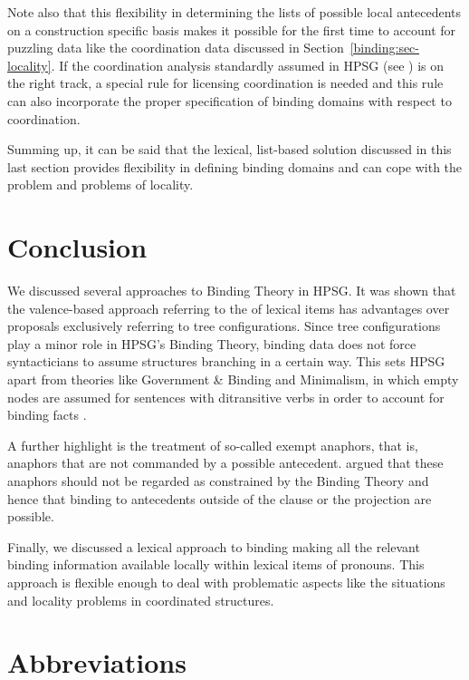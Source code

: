 \documentclass[output=paper
 	        ,biblatex
                ,babelshorthands
                ,newtxmath
                ,draftmode
                ,colorlinks, citecolor=brown
]{langscibook}
\begin{document}
Note also that this flexibility in determining the lists of possible local antecedents on a
construction specific basis makes it possible for the first time to account for puzzling data like
the coordination data discussed in Section~\ref{binding:sec-locality}. If the coordination analysis
standardly assumed in HPSG (see ) is on the right track, a special
rule for licensing coordination is needed and this rule can also incorporate the proper
specification of binding domains with respect to coordination.


Summing up, it can be said that the lexical, list-based solution discussed in this last section
provides flexibility in defining binding domains and can cope with the \iwithini problem and
problems of locality. 




\section{Conclusion}

We discussed several approaches to Binding Theory in HPSG. It was shown that the
valence-based approach referring to the \argstl of lexical items has advantages over proposals
exclusively referring to tree configurations. Since tree configurations play a minor role in HPSG's
Binding Theory, binding data does not force syntacticians to assume structures branching in a
certain way. This sets HPSG apart from theories like Government \& Binding and Minimalism, in which
empty nodes are assumed for sentences with ditransitive verbs in order to account for binding facts
\crossrefchapterp[\pageref{minimalism:page-binding-branching-start}--\pageref{minimalism:page-binding-branching-end}]{minimalism}. 

A further highlight is the treatment of so-called exempt anaphors, that is, anaphors that are not
commanded by a possible antecedent. \citet{PS92a}
argued that these anaphors should not be regarded
as constrained by the Binding Theory and hence that binding to antecedents outside of the clause or
the projection are possible.

Finally, we discussed a lexical approach to binding making all the relevant binding information
available locally within lexical items of pronouns. This approach is flexible enough to deal with
problematic aspects like the \iwithini situations and locality problems in coordinated structures.

\section*{Abbreviations}
\end{document}
